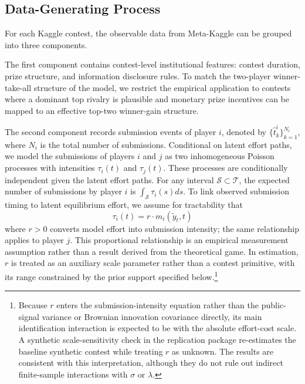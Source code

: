 \documentclass[mnsc]{informs3}
\begin{document}
\subsection{Data-Generating Process}

For each Kaggle contest, the observable data from Meta-Kaggle can be grouped into three components.

The first component contains contest-level institutional features: contest duration, prize structure, and information disclosure rules.
To match the two-player winner-take-all structure of the model, we restrict the empirical application to contests where a dominant top rivalry is plausible and monetary prize incentives can be mapped to an effective top-two winner-gain structure.

The second component records submission events of player $i$, denoted by $\{\hat{t}^i_k\}_{k=1}^{N_i}$, where $N_i$ is the total number of submissions.
Conditional on latent effort paths, we model the submissions of players $i$ and $j$ as two inhomogeneous Poisson processes with intensities $\tau_i(t)$ and $\tau_j(t)$. These processes are conditionally independent given the latent effort paths.
For any interval $\mathcal{S}\subset\mathcal{T}$, the expected number of submissions by player $i$ is $\int_{\mathcal{S}}\tau_i(s)ds$.
To link observed submission timing to latent equilibrium effort, we assume for tractability that
\begin{equation}\label{eq-model-intensity}
\tau_i(t) = r \cdot m_i(\tilde{y}_t, t)
\end{equation}
where \(r>0\) converts model effort into submission intensity; the same relationship applies to player \(j\). This proportional relationship is an empirical measurement assumption rather than a result derived from the theoretical game. In estimation, \(r\) is treated as an auxiliary scale parameter rather than a contest primitive, with its range constrained by the prior support specified below.\footnote{
Because $r$ enters the submission-intensity equation rather than the public-signal variance or Brownian innovation covariance directly, its main identification interaction is expected to be with the absolute effort-cost scale. 
A synthetic scale-sensitivity check in the replication package re-estimates the baseline synthetic contest while treating $r$ as unknown. 
The results are consistent with this interpretation, although they do not rule out indirect finite-sample interactions with $\sigma$ or $\lambda$.
}
\end{document}
